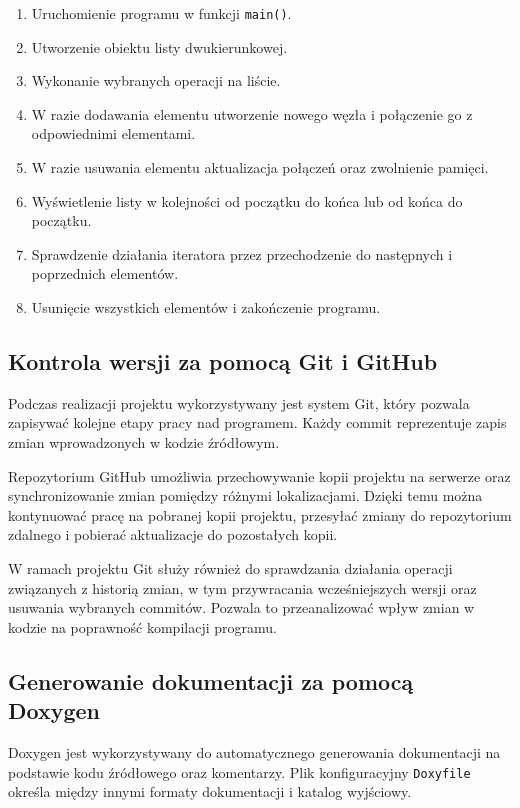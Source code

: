 \begin{enumerate}
    \item Uruchomienie programu w funkcji \texttt{main()}.
    \item Utworzenie obiektu listy dwukierunkowej.
    \item Wykonanie wybranych operacji na liście.
    \item W razie dodawania elementu utworzenie nowego węzła
    i połączenie go z odpowiednimi elementami.
    \item W razie usuwania elementu aktualizacja połączeń
    oraz zwolnienie pamięci.
    \item Wyświetlenie listy w kolejności od początku do końca
    lub od końca do początku.
    \item Sprawdzenie działania iteratora przez przechodzenie
    do następnych i poprzednich elementów.
    \item Usunięcie wszystkich elementów i zakończenie programu.
\end{enumerate}

\subsection{Kontrola wersji za pomocą Git i GitHub}

Podczas realizacji projektu wykorzystywany jest system Git,
który pozwala zapisywać kolejne etapy pracy nad programem.
Każdy commit reprezentuje zapis zmian wprowadzonych w kodzie
źródłowym.

Repozytorium GitHub umożliwia przechowywanie kopii projektu
na serwerze oraz synchronizowanie zmian pomiędzy różnymi
lokalizacjami. Dzięki temu można kontynuować pracę na pobranej
kopii projektu, przesyłać zmiany do repozytorium zdalnego
i pobierać aktualizacje do pozostałych kopii.

W ramach projektu Git służy również do sprawdzania działania
operacji związanych z historią zmian, w tym przywracania
wcześniejszych wersji oraz usuwania wybranych commitów.
Pozwala to przeanalizować wpływ zmian w kodzie na poprawność
kompilacji programu.

\subsection{Generowanie dokumentacji za pomocą Doxygen}

Doxygen jest wykorzystywany do automatycznego generowania
dokumentacji na podstawie kodu źródłowego oraz komentarzy.
Plik konfiguracyjny \texttt{Doxyfile} określa między innymi
formaty dokumentacji i katalog wyjściowy.

